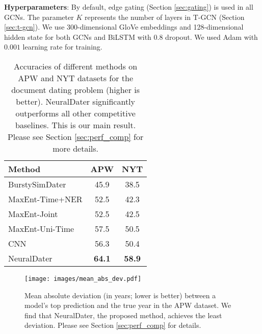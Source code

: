\documentclass[11pt,a4paper]{article}
\newcommand{\refsec}[1]{Section \ref{#1}}
\newcommand{\method}{NeuralDater}
\begin{document}
\textbf{Hyperparameters}: By default, edge gating (\refsec{sec:gating}) is used in all GCNs. The parameter $K$ represents the number of layers in T-GCN (\refsec{sec:t-gcn}). We use 300-dimensional GloVe embeddings and 128-dimensional hidden state for both GCNs and BiLSTM with $0.8$ dropout. We used Adam \cite{adam_optimizer} with $0.001$ learning rate for training. 

\begin{table}[t]
	\centering
	\begin{tabular}{lcc}
		\toprule
		Method 			 & APW & NYT \\
		\midrule		
		\addlinespace
		BurstySimDater 		& 45.9 & 38.5 \\
		MaxEnt-Time+NER		& 52.5 & 42.3 \\
		MaxEnt-Joint		& 52.5 & 42.5 \\
		MaxEnt-Uni-Time		& 57.5 & 50.5 \\
		CNN 				& 56.3 & 50.4 \\
		\method{}			& \textbf{64.1} & \textbf{58.9} \\
		\bottomrule
	\end{tabular}
	\caption{\label{tb:result_main}Accuracies of different methods on APW and NYT datasets for the document dating problem (higher is better). \method{} significantly outperforms all other competitive baselines. This is our main result. Please see \refsec{sec:perf_comp} for more details.}

\end{table}

\begin{figure}[t]
	\centering
	\texttt{[image: images/mean\_abs\_dev.pdf]}
	\caption{\label{fig:results_mean_dev}Mean absolute deviation (in years; lower is better) between a model's top prediction and the true year in the APW dataset. We find that \method{}, the proposed method, achieves the least deviation. Please see \refsec{sec:perf_comp} for details. }
\end{figure}
\end{document}
